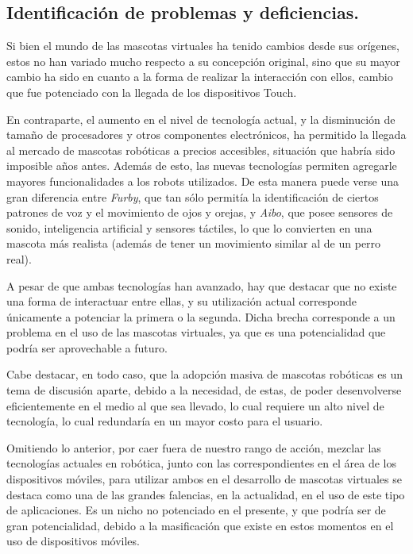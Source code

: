 \subsection{Identificaci\'on de problemas y deficiencias.}

Si bien el mundo de las mascotas virtuales ha tenido cambios desde sus or\'igenes, estos no han variado mucho respecto a su concepci\'on original, sino que su mayor cambio ha sido en cuanto a la forma de realizar la interacci\'on con ellos, cambio que fue potenciado con la llegada de los dispositivos Touch.

En contraparte, el aumento en el nivel de tecnolog\'ia actual, y la disminuci\'on de tama\~no de procesadores y otros componentes electr\'onicos, ha permitido la llegada al mercado de mascotas rob\'oticas a precios accesibles, situaci\'on que habr\'ia sido imposible a\~nos antes. Adem\'as de esto, las nuevas tecnolog\'ias permiten agregarle mayores funcionalidades a los robots utilizados. De esta manera puede verse una gran diferencia entre \emph{Furby}, que tan s\'olo permit\'ia la identificaci\'on de ciertos patrones de voz y el movimiento de ojos y orejas, y \emph{Aibo}, que posee sensores de sonido, inteligencia artificial y sensores t\'actiles, lo que lo convierten en una mascota m\'as realista (adem\'as de tener un movimiento similar al de un perro real).

A pesar de que ambas tecnolog\'ias han avanzado, hay que destacar que no existe una forma de interactuar entre ellas, y su utilizaci\'on actual corresponde \'unicamente a potenciar la primera o la segunda. Dicha brecha corresponde a un problema en el uso de las mascotas virtuales, ya que es una potencialidad que podr\'ia ser aprovechable a futuro.

Cabe destacar, en todo caso, que la adopci\'on masiva de mascotas rob\'oticas es un tema de discusi\'on aparte, debido a la necesidad, de estas, de poder desenvolverse eficientemente en el medio al que sea llevado, lo cual requiere un alto nivel de tecnolog\'ia, lo cual redundar\'ia en un mayor costo para el usuario.

Omitiendo lo anterior, por caer fuera de nuestro rango de acci\'on, mezclar las tecnolog\'ias actuales en rob\'otica, junto con las correspondientes en el \'area de los dispositivos m\'oviles, para utilizar ambos en el desarrollo de mascotas virtuales se destaca como una de las grandes falencias, en la actualidad, en el uso de este tipo de aplicaciones. Es un nicho no potenciado en el presente, y que podr\'ia ser de gran potencialidad, debido a la masificaci\'on que existe en estos momentos en el uso de dispositivos m\'oviles.

